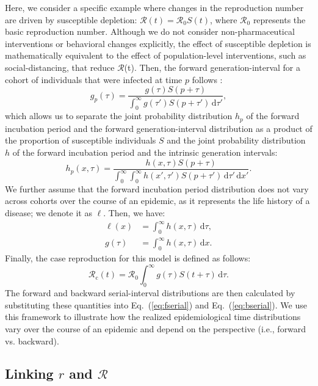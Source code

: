 \documentclass[12pt]{article}
\newcommand{\eref}[1]{Eq.~(\ref{eq:#1})}
\newcommand{\Rx}[1]{\ensuremath{{\mathcal R}_{#1}}\xspace}
\newcommand{\Ro}{\Rx{0}}
\newcommand{\Rc}{\Rx{\mathrm{c}}}
\newcommand{\RR}{\ensuremath{{\mathcal R}}\xspace}
\newcommand{\dd}[1]{\ensuremath{\, \mathrm{d}#1}}
\newcommand{\dtau}{\dd{\tau}}
\newcommand{\dx}{\dd{x}}
\newcommand{\psymp}{\ensuremath{p}} %
\newcommand{\gdist}{g} %
\newcommand{\idist}{\ell} %
\begin{document}
Here, we consider a specific example where changes in the reproduction number are driven by susceptible depletion: $\RR(t) = \Ro S(t)$, where \Ro represents the basic reproduction number.
Although we do not consider non-pharmaceutical interventions or behavioral changes explicitly, the effect of susceptible depletion is mathematically equivalent to the effect of population-level interventions, such as social-distancing, that reduce \RR(t).
Then, the forward generation-interval for a cohort of individuals that were infected at time $\psymp$ follows \citep{champredon2015intrinsic}:
\begin{equation}
\gdist_\psymp (\tau) = \frac{ \gdist(\tau) S(\psymp + \tau)}{\int_0^\infty \gdist(\tau') S(\psymp + \tau') \dtau'},
\end{equation}
which allows us to separate the joint probability distribution $h_\psymp$ of the forward incubation period and the forward generation-interval distribution as a product of the proportion of susceptible individuals $S$ and the joint probability distribution $h$ of the forward incubation period and the intrinsic generation intervals:
\begin{equation}
h_\psymp (x, \tau) = \frac{h(x, \tau) S(\psymp + \tau)}{\int_0^\infty \int_0^\infty h(x', \tau') S(\psymp + \tau') \dtau' \dx'}.
\end{equation}
We further assume that the forward incubation period distribution does
not vary across cohorts over the course of an epidemic, as it
represents the life history of a disease; we denote it as $\idist$.
Then, we have:
\begin{align}
\idist(x) &= \int_0^\infty h(x, \tau) \dtau\nonumber,\\
\gdist(\tau) &= \int_0^\infty h(x, \tau) \dx.
\label{eq:marginal}
\end{align}
Finally, the case reproduction for this model is defined as follows:
\begin{equation}
\Rc(t) = \Ro \int_0^\infty \gdist(\tau) S(t+\tau) \dtau.
\end{equation}
The forward and backward serial-interval distributions are then calculated by substituting these quantities into \eref{fserial} and \eref{bserial}.
We use this framework to illustrate how the realized epidemiological time distributions vary over the course of an epidemic and depend on the perspective (i.e., forward vs. backward).

\subsection{Linking $r$ and \RR}
\end{document}
